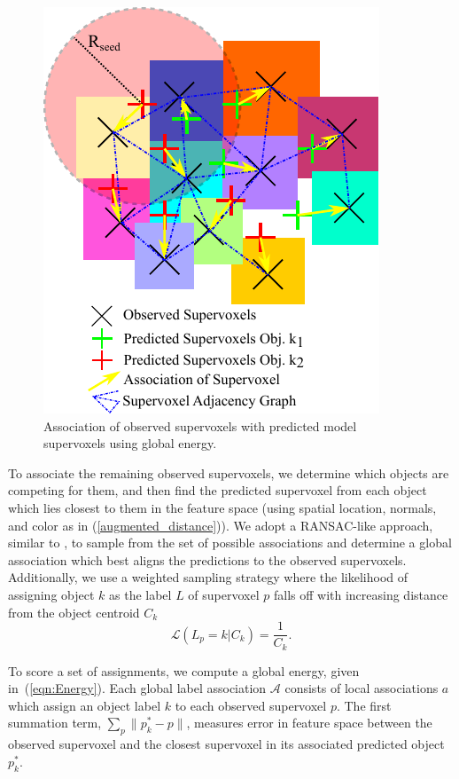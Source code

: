 \begin{figure}[tb]
  \centering
  \includegraphics[scale=1.0]{figures/IROS2013/Association.pdf}
  \caption[Supervoxel Association]{Association of observed supervoxels with predicted model supervoxels using global energy.}
  \label{fig:Association}
\end{figure}

To associate the remaining observed supervoxels, we determine which objects are competing for them, and then find the predicted supervoxel from each object which lies closest to them in the feature space (using spatial location, normals, and color as in (\ref{augmented_distance})). We adopt a RANSAC-like approach, similar to \cite{EnergyBasedMultiModel}, to sample from the set of possible associations and determine a global association which best aligns the predictions to the observed supervoxels. Additionally, we use a weighted sampling strategy where the likelihood of assigning object $k$ as the label $L$ of supervoxel $p$ falls off with increasing distance from the object centroid $C_k$
\begin{equation}
 \label{eqn:WeightSampling}
 \mathcal{L}(L_p=k | C_k) = \frac{1}{C_k}.
\end{equation}

To score a set of assignments, we compute a global energy, given in~(\ref{eqn:Energy}). Each global label association $\mathcal{A}$ consists of local associations $a$ which assign an object label $k$ to each observed supervoxel $p$. The first summation term, $ \sum_{p}{\|p^*_k - p\|} $, measures error in feature space between the observed supervoxel and the closest supervoxel in its associated predicted object $p^*_k$. 

